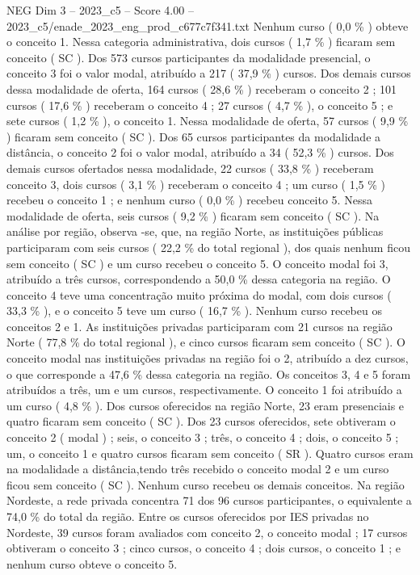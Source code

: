 \begin{textsample}{NEG Dim 3 – 2023\_c5 – Score 4.00 – 2023\_c5/enade\_2023\_eng\_prod\_c677c7f341.txt}
Nenhum curso ( 0,0 \% ) obteve o conceito 1.
Nessa categoria administrativa, dois cursos ( 1,7 \% ) ficaram sem conceito ( SC ).
Dos 573 cursos participantes da modalidade presencial, o conceito 3 foi o valor modal, atribuído a 217 ( 37,9 \% ) cursos.
Dos demais cursos dessa modalidade de oferta, 164 cursos ( 28,6 \% ) receberam o conceito 2 ; 101 cursos ( 17,6 \% ) receberam o conceito 4 ; 27 cursos ( 4,7 \% ), o conceito 5 ; e sete cursos ( 1,2 \% ), o conceito 1.
Nessa modalidade de oferta, 57 cursos ( 9,9 \% ) ficaram sem conceito ( SC ).
Dos 65 cursos participantes da modalidade a distância, o conceito 2 foi o valor modal, atribuído a 34 ( 52,3 \% ) cursos.
Dos demais cursos ofertados nessa modalidade, 22 cursos ( 33,8 \% ) receberam conceito 3, dois cursos ( 3,1 \% ) receberam o conceito 4 ; um curso ( 1,5 \% ) recebeu o conceito 1 ; e nenhum curso ( 0,0 \% ) recebeu conceito 5.
Nessa modalidade de oferta, seis cursos ( 9,2 \% ) ficaram sem conceito ( SC ).
Na análise por região, observa -se, que, na região Norte, as instituições públicas participaram com seis cursos ( 22,2 \% do total regional ), dos quais nenhum ficou sem conceito ( SC ) e um curso recebeu o conceito 5.
O conceito modal foi 3, atribuído a três cursos, correspondendo a 50,0 \% dessa categoria na região.
O conceito 4 teve uma concentração muito próxima do modal, com dois cursos ( 33,3 \% ), e o conceito 5 teve um curso ( 16,7 \% ).
Nenhum curso recebeu os conceitos 2 e 1.
As instituições privadas participaram com 21 cursos na região Norte ( 77,8 \% do total regional ), e cinco cursos ficaram sem conceito ( SC ).
O conceito modal nas instituições privadas na região foi o 2, atribuído a dez cursos, o que corresponde a 47,6 \% dessa categoria na região.
Os conceitos 3, 4 e 5 foram atribuídos a três, um e um cursos, respectivamente.
O conceito 1 foi atribuído a um curso ( 4,8 \% ).
Dos cursos oferecidos na região Norte, 23 eram presenciais e quatro ficaram sem conceito ( SC ).
Dos 23 cursos oferecidos, sete obtiveram o conceito 2 ( modal ) ; seis, o conceito 3 ; três, o conceito 4 ; dois, o conceito 5 ; um, o conceito 1 e quatro cursos ficaram sem conceito ( SR ).
Quatro cursos eram na modalidade a distância,tendo três recebido o conceito modal 2 e um curso ficou sem conceito ( SC ).
Nenhum curso recebeu os demais conceitos.
Na região Nordeste, a rede privada concentra 71 dos 96 cursos participantes, o equivalente a 74,0 \% do total da região.
Entre os cursos oferecidos por IES privadas no Nordeste, 39 cursos foram avaliados com conceito 2, o conceito modal ; 17 cursos obtiveram o conceito 3 ; cinco cursos, o conceito 4 ; dois cursos, o conceito 1 ; e nenhum curso obteve o conceito 5.

\end{textsample}
